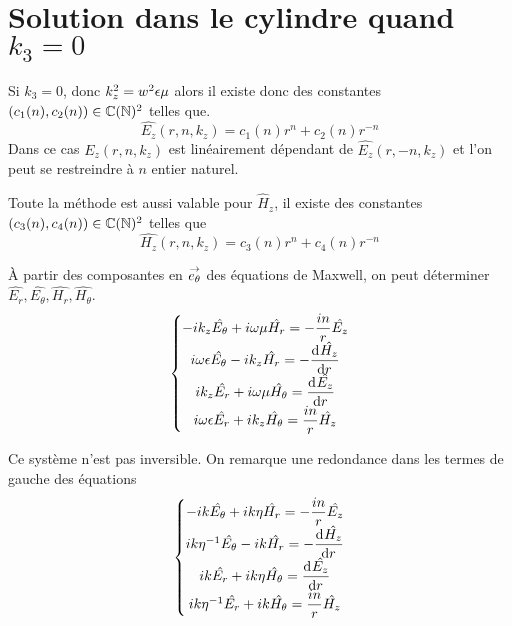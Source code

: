\section[Solution dans le cylindre quand k3 = 0]{Solution dans le cylindre quand \(k_3 = 0\)}
  \label{sec:annexe:cylindre:k3_nul}
  Si \(k_3 = 0\), donc \(k_z^2 = w^2\eps\mu\) alors il existe donc des constantes \((c_1(n),c_2(n)) \in \CC(\NN)^2\) telles que.
  \begin{equation*}
    \hat{E_z}(r,n,k_z) = c_1(n) r^n + c_2(n)r^{-n}
  \end{equation*}
  Dans ce cas \(\hat{E_z}(r,n,k_z)\) est linéairement dépendant de  \(\hat{E_z}(r,-n,k_z)\) et l'on peut se restreindre à \(n\) entier naturel.

  Toute la méthode est aussi valable pour \(\hat H_z\), il existe des constantes \((c_3(n),c_4(n)) \in \CC(\NN)^2\) telles que
  \begin{equation*}
    \hat{H_z}(r,n,k_z) = c_3(n) r^n + c_4(n)r^{-n}
  \end{equation*}

  À partir des composantes en \(\vect{e_\theta}\) des équations de Maxwell, on peut déterminer \(\hat{E_r},\hat{E_\theta},\hat{H_r},\hat{H_\theta}\).
  \begin{equation*}
    \left\lbrace
    \begin{matrix}
      -ik_z\hat{E_\theta} + i\w\mu \hat{H_r} = -\frac{in}{r}\hat{E_z}
      \\
      i\w\eps \hat{E_\theta} - ik_z \hat{H_r} = -\ddp{r}{\hat{H_z}}
      \\
      ik_z\hat{E_r} + i\w\mu \hat{H_\theta} = \ddp{r}{\hat{E_z}}
      \\
      i\w\eps \hat{E_r} + ik_z \hat{H_\theta} = \frac{in}{r}\hat{H_z}
    \end{matrix}
    \right.
  \end{equation*}

  Ce système n'est pas inversible. On remarque une redondance dans les termes de gauche des équations
  \begin{equation}
      \left\lbrace
      \begin{matrix}
          -ik\hat{E_\theta} + ik\eta \hat{H_r} = -\frac{in}{r}\hat{E_z}
          \\
          ik\eta^{-1} \hat{E_\theta} - ik \hat{H_r} = -\ddp{r}{\hat{H_z}}            
          \\
          ik\hat{E_r} + ik\eta \hat{H_\theta} = \ddp{r}{\hat{E_z}}
          \\
          ik\eta^{-1} \hat{E_r} + ik \hat{H_\theta} = \frac{in}{r}\hat{H_z}
      \end{matrix}
      \right.
  \end{equation}

